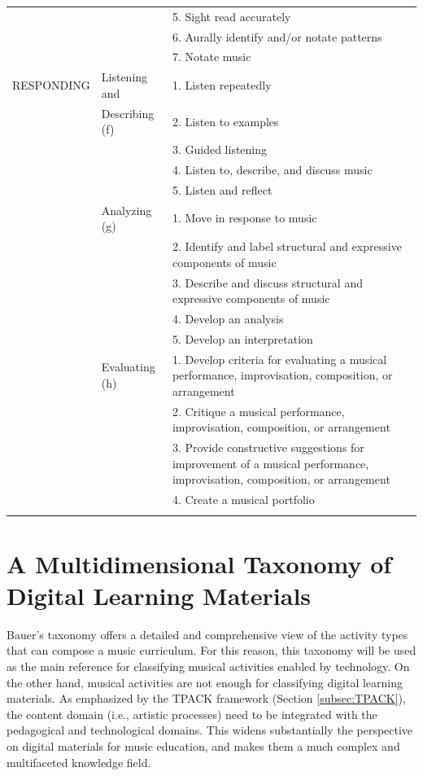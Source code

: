 \documentclass[journal]{IEEEtran}
\begin{document}
\begin{table}[htbp]
\begin{tabular}{p{}p{}p{}}
		&  & 5. Sight read accurately\\
		&  & 6. Aurally identify and/or notate patterns\\
		&  & 7. Notate music\\
		
		\hline\noalign{\smallskip}
		RESPONDING & Listening and & 1. Listen repeatedly\\
		& Describing (f)& 2. Listen to examples\\
		& & 3. Guided listening\\
		& & 4. Listen to, describe, and discuss music\\
		& & 5. Listen and reflect\\
		
		\cline{2-3}
		
		& Analyzing (g)& 1. Move in response to music\\
		& & 2. Identify and label structural and expressive components of music\\
		& & 3. Describe and discuss structural and expressive components of music\\
		& & 4. Develop an analysis\\
		& & 5. Develop an interpretation\\
		
		\cline{2-3}
		
		&  Evaluating (h)& 1. Develop criteria for evaluating a musical performance, improvisation, composition, or arrangement\\
		&  & 2. Critique a musical performance, improvisation, composition, or arrangement\\
		&  & 3. Provide constructive suggestions for improvement of a musical performance, improvisation, composition, or arrangement\\
		&  & 4. Create a musical portfolio\\
		\hline\noalign{\smallskip}
	\end{tabular}
\end{table}



\section{A Multidimensional Taxonomy of Digital Learning Materials}
\label{sec:MTDLM}

Bauer's taxonomy   
offers a detailed and comprehensive view of the activity types that can compose a music curriculum. For this reason, this taxonomy will be used as the main reference for classifying musical activities enabled by technology. 
%
On the other hand, musical activities are not enough for classifying digital learning materials. As emphasized by the TPACK framework (Section \ref{subsec:TPACK}), the content domain (i.e., artistic processes) need to be integrated with the pedagogical and technological domains. This widens substantially the perspective on digital materials for music education, and makes them a much complex and multifaceted knowledge field. 
\end{document}
